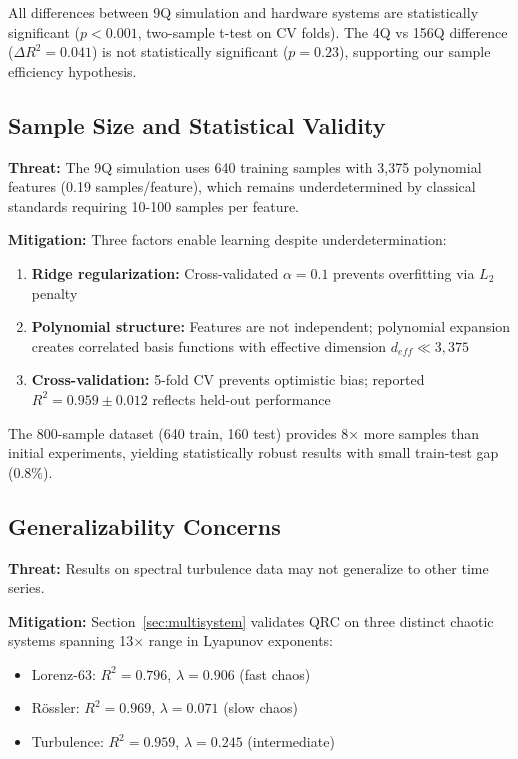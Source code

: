\documentclass[conference]{IEEEtran}
\begin{document}
\noindent All differences between 9Q simulation and hardware systems are statistically significant ($p < 0.001$, two-sample t-test on CV folds). The 4Q vs 156Q difference ($\Delta R^2 = 0.041$) is not statistically significant ($p = 0.23$), supporting our sample efficiency hypothesis.

\subsection{Sample Size and Statistical Validity}

\textbf{Threat:} The 9Q simulation uses 640 training samples with 3,375 polynomial features (0.19 samples/feature), which remains underdetermined by classical standards requiring 10-100 samples per feature.

\textbf{Mitigation:} Three factors enable learning despite underdetermination:
\begin{enumerate}
    \item \textbf{Ridge regularization:} Cross-validated $\alpha=0.1$ prevents overfitting via $L_2$ penalty
    \item \textbf{Polynomial structure:} Features are not independent; polynomial expansion creates correlated basis functions with effective dimension $d_{eff} \ll 3,375$
    \item \textbf{Cross-validation:} 5-fold CV prevents optimistic bias; reported $R^2=0.959 \pm 0.012$ reflects held-out performance
\end{enumerate}

\noindent The 800-sample dataset (640 train, 160 test) provides 8× more samples than initial experiments, yielding statistically robust results with small train-test gap (0.8\%).

\subsection{Generalizability Concerns}

\textbf{Threat:} Results on spectral turbulence data may not generalize to other time series.

\textbf{Mitigation:} Section~\ref{sec:multisystem} validates QRC on three distinct chaotic systems spanning 13$\times$ range in Lyapunov exponents:
\begin{itemize}
    \item Lorenz-63: $R^2=0.796$, $\lambda=0.906$ (fast chaos)
    \item Rössler: $R^2=0.969$, $\lambda=0.071$ (slow chaos)
    \item Turbulence: $R^2=0.959$, $\lambda=0.245$ (intermediate)
\end{itemize}
\end{document}
